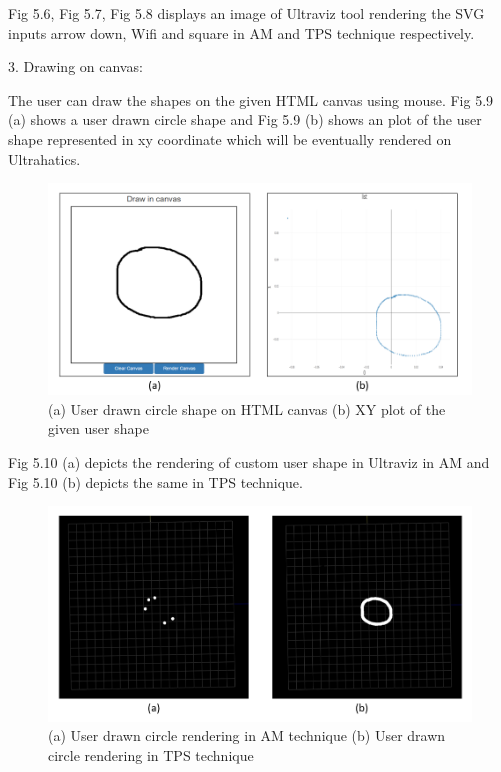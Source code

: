 Fig 5.6, Fig 5.7, Fig 5.8 displays an image of Ultraviz tool rendering the SVG inputs arrow down, Wifi and square in AM and TPS technique respectively.

3. Drawing on canvas:

The user can draw the shapes on the given HTML canvas using mouse. Fig 5.9 (a) shows a user drawn circle shape and Fig 5.9 (b) shows an plot of the user shape represented in xy coordinate which will be eventually rendered on Ultrahatics.

\begin{figure}[htb]
	\includegraphics[width=\textwidth]{gfx/canvas input.png}
	\caption{(a) User drawn circle shape on HTML canvas (b) XY plot of the given user shape}
	\label{fig:validation:svg_sq_tps}
\end{figure}

Fig 5.10 (a) depicts the rendering of custom user shape in Ultraviz in AM and Fig 5.10 (b) depicts the same in TPS technique.

\begin{figure}[htb]
	\includegraphics[width=\textwidth]{gfx/canvas_uv.png}
	\caption{(a) User drawn circle rendering in AM technique (b) User drawn circle rendering in TPS technique}
	\label{fig:validation:svg_sq_tps}
\end{figure}

